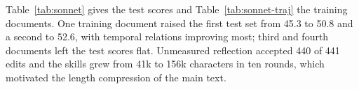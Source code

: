 Table~\ref{tab:sonnet} gives the test scores and Table~\ref{tab:sonnet-traj} the training documents. One training document raised the first test set from 45.3 to 50.8 \F and a second to 52.6, with temporal relations improving most; third and fourth documents left the test scores flat. Unmeasured reflection accepted 440 of 441 edits and the skills grew from 41k to 156k characters in ten rounds, which motivated the length compression of the main text.
